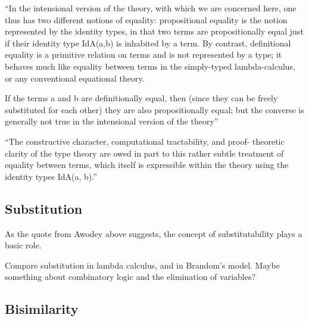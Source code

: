``In the intensional version of the theory, with which we are
concerned here, one thus has two different notions of equality:
propositional equality is the notion represented by the identity
types, in that two terms are propositionally equal just if their
identity type IdA(a,b) is inhabited by a term. By contrast,
definitional equality is a primitive relation on terms and is not
represented by a type; it behaves much like equality between terms in
the simply-typed lambda-calculus, or any conventional equational
theory.

If the terms a and b are definitionally equal, then (since they can be
freely substituted for each other) they are also propositionally
equal; but the converse is generally not true in the intensional
version of the theory''\cite{awodey_tth}

``The constructive character, computational tractability, and proof-
theoretic clarity of the type theory are owed in part to this rather
subtle treatment of equality between terms, which itself is
expressible within the theory using the identity types IdA(a, b).''\cite{awodey_tth}

\subsection{Substitution}
\label{subs:substitution}

As the quote from Awodey above suggests, the concept of
substitutability plays a basic role.

\begin{ednote}
  Compare substitution in lambda calculus, and in Brandom's model.
  Maybe something about combinatory logic and the elimination of
  variables?
\end{ednote}

\subsection{Bisimilarity}
\label{subs:bisimilarity}

